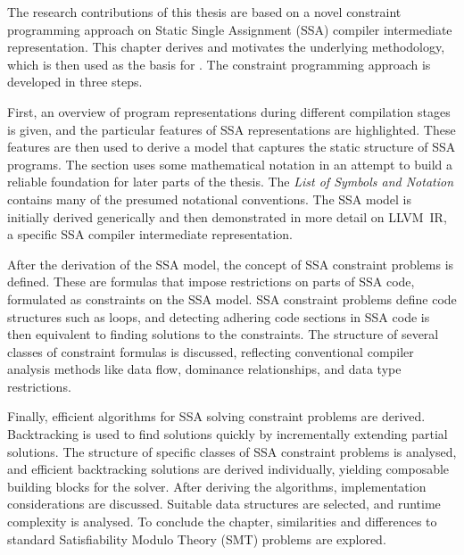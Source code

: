 
    The research contributions of this thesis are based on a novel constraint
    programming approach on Static Single Assignment (SSA) compiler intermediate
    representation.
    This chapter derives and motivates the underlying methodology, which is
    then used as the basis for
    .
    The constraint programming approach is developed in three steps.

    First, an overview of program representations during different compilation
    stages is given, and the particular features of SSA representations are
    highlighted.
    These features are then used to derive a model that captures the static
    structure of SSA programs.
    The section uses some mathematical notation in an attempt to build a
    reliable foundation for later parts of the thesis.
    The {\it List of Symbols and Notation} contains many of the presumed
    notational conventions.
    The SSA model is initially derived generically and then demonstrated in
    more detail on \mbox{LLVM IR}, a specific SSA compiler intermediate
    representation.

    After the derivation of the SSA model, the concept of SSA constraint
    problems is defined.
    These are formulas that impose restrictions on parts of SSA code,
    formulated as constraints on the SSA model.
    SSA constraint problems define code structures such as loops, and detecting
    adhering code sections in SSA code is then equivalent to finding
    solutions to the constraints.
    The structure of several classes of constraint formulas is discussed,
    reflecting conventional compiler analysis methods like data flow,
    dominance relationships, and data type restrictions.

    Finally, efficient algorithms for SSA solving constraint problems are
    derived.
    Backtracking is used to find solutions quickly by incrementally extending
    partial solutions.
    The structure of specific classes of SSA constraint problems is analysed,
    and efficient backtracking solutions are derived individually, yielding
    composable building blocks for the solver.
    After deriving the algorithms, implementation considerations are
    discussed.
    Suitable data structures are selected, and runtime complexity is analysed.
    To conclude the chapter, similarities and differences to standard
    Satisfiability Modulo Theory (SMT) problems are explored.


